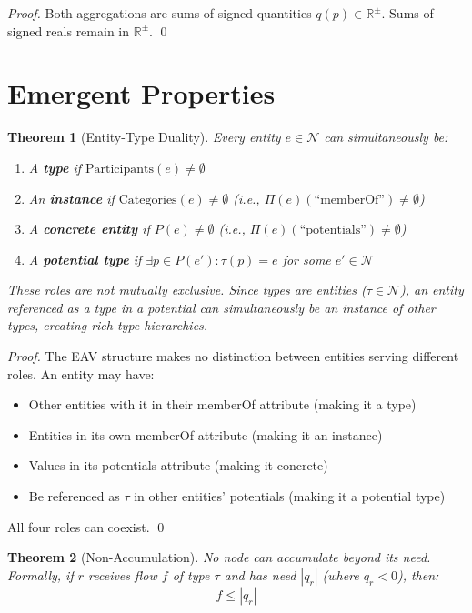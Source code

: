\documentclass[11pt]{article}
\newtheorem{theorem}{Theorem}
\begin{document}
\begin{proof}
Both aggregations are sums of signed quantities $q(p) \in \mathbb{R}^\pm$. Sums of signed reals remain in $\mathbb{R}^\pm$. \qed
\end{proof}

\section{Emergent Properties}

\begin{theorem}[Entity-Type Duality]
Every entity $e \in \mathcal{N}$ can simultaneously be:
\begin{enumerate}
\item A \textbf{type} if $\text{Participants}(e) \neq \emptyset$
\item An \textbf{instance} if $\text{Categories}(e) \neq \emptyset$ (i.e., $\Pi(e)(\text{``memberOf''}) \neq \emptyset$)
\item A \textbf{concrete entity} if $P(e) \neq \emptyset$ (i.e., $\Pi(e)(\text{``potentials''}) \neq \emptyset$)
\item A \textbf{potential type} if $\exists p \in P(e'): \tau(p) = e$ for some $e' \in \mathcal{N}$
\end{enumerate}
These roles are not mutually exclusive. Since types are entities ($\tau \in \mathcal{N}$), an entity referenced as a type in a potential can simultaneously be an instance of other types, creating rich type hierarchies.
\end{theorem}

\begin{proof}
The EAV structure makes no distinction between entities serving different roles. An entity may have:
\begin{itemize}
\item Other entities with it in their memberOf attribute (making it a type)
\item Entities in its own memberOf attribute (making it an instance)
\item Values in its potentials attribute (making it concrete)
\item Be referenced as $\tau$ in other entities' potentials (making it a potential type)
\end{itemize}
All four roles can coexist. \qed
\end{proof}

\begin{theorem}[Non-Accumulation]
No node can accumulate beyond its need. Formally, if $r$ receives flow $f$ of type $\tau$ and has need $|q_r|$ (where $q_r < 0$), then:
\[
f \leq |q_r|
\]
\end{theorem}
\end{document}
